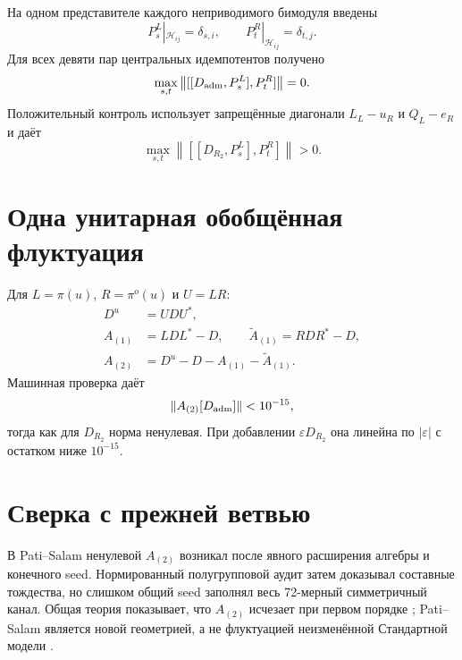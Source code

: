 На одном представителе каждого неприводимого бимодуля введены
\begin{equation}
 P_s^L|_{\mathcal H_{ij}}=\delta_{s,i},
 \qquad P_t^R|_{\mathcal H_{ij}}=\delta_{t,j}.
 \label{eq:v7-a2-central-projectors}
\end{equation}
Для всех девяти пар центральных идемпотентов получено
\begin{equation}
 \max_{s,t}\left\|[[D_{\rm adm},P_s^L],P_t^R]\right\|=0.
 \label{eq:v7-a2-admitted-residual}
\end{equation}
Положительный контроль использует запрещённые диагонали $L_L-u_R$ и
$Q_L-e_R$ и даёт
\begin{equation}
 \max_{s,t}\left\|[[D_{R_2},P_s^L],P_t^R]\right\|>0.
 \label{eq:v7-a2-forbidden-residual}
\end{equation}

\section{Одна унитарная обобщённая флуктуация}

Для $L=\pi(u)$, $R=\pi^o(u)$ и $U=LR$:
\begin{align}
 D^u&=UDU^*,\nonumber\\
 A_{(1)}&=LDL^*-D,\qquad
 \widetilde A_{(1)}=RDR^*-D,\nonumber\\
 A_{(2)}&=D^u-D-A_{(1)}-\widetilde A_{(1)}.
 \label{eq:v7-a2-unitary-decomposition}
\end{align}
Машинная проверка даёт
\begin{equation}
 \|A_{(2)}[D_{\rm adm}]\|<10^{-15},
 \label{eq:v7-a2-unitary-admitted-zero}
\end{equation}
тогда как для $D_{R_2}$ норма ненулевая. При добавлении
$\varepsilon D_{R_2}$ она линейна по $|\varepsilon|$ с остатком ниже
$10^{-15}$.

\section{Сверка с прежней ветвью}

В Pati--Salam ненулевой $A_{(2)}$ возникал после явного расширения алгебры
и конечного seed. Нормированный полугрупповой аудит затем доказывал
составные тождества, но слишком общий seed заполнял весь 72-мерный
симметричный канал. Общая теория показывает, что $A_{(2)}$ исчезает при
первом порядке \cite{v7a2-generalized}; Pati--Salam является новой
геометрией, а не флуктуацией неизменённой Стандартной модели
\cite{v7a2-pati-salam}.

